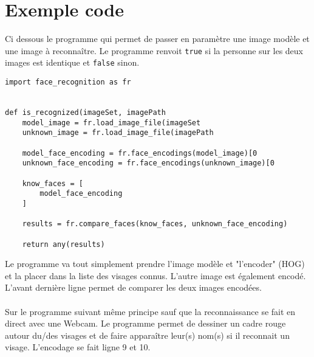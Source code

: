 \section{Exemple code}
Ci dessous le programme qui permet de passer en paramètre une image modèle et
une image à reconnaître. Le programme renvoit \verb|true| si la personne sur les deux
images est identique et \verb|false| sinon.
\\
\begin{verbatim}
import face_recognition as fr


def is_recognized(imageSet, imagePath
    model_image = fr.load_image_file(imageSet
    unknown_image = fr.load_image_file(imagePath

    model_face_encoding = fr.face_encodings(model_image)[0
    unknown_face_encoding = fr.face_encodings(unknown_image)[0

    know_faces = [
        model_face_encoding
    ]

    results = fr.compare_faces(know_faces, unknown_face_encoding)

    return any(results)
\end{verbatim}

Le programme va tout simplement prendre l'image modèle et "l'encoder" (HOG) et
la placer dans la liste des visages connus. L'autre image est également
encodé. L'avant dernière ligne permet de comparer les deux images encodées.
\\
\\
Sur le programme suivant même principe sauf que la reconnaissance se fait en direct
avec une Webcam. Le programme permet de dessiner un cadre rouge autour du/des
visages et de faire apparaître leur(s) nom(s) si il reconnait un visage.
L'encodage se fait ligne 9 et 10.
\newpage

